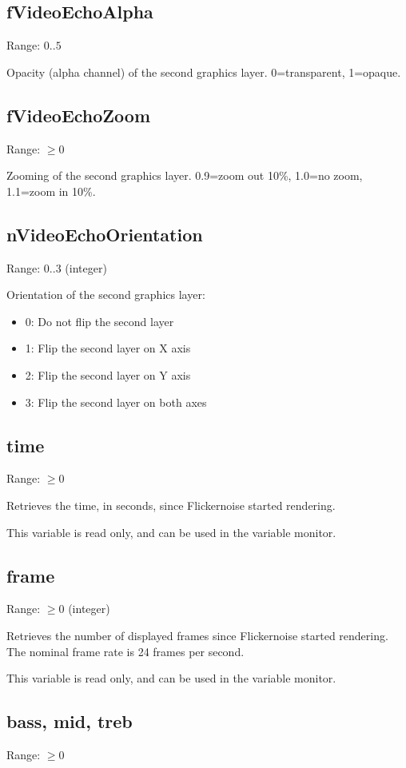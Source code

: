 \documentclass[11pt, a5paper, pagesize]{scrbook}
\begin{document}
\subsection{fVideoEchoAlpha}
Range: $0..5$

Opacity (alpha channel) of the second graphics layer. 0=transparent, 1=opaque.

\subsection{fVideoEchoZoom}
Range: $\geq 0$

Zooming of the second graphics layer. 0.9=zoom out 10\%, 1.0=no zoom, 1.1=zoom in 10\%.

\subsection{nVideoEchoOrientation}
Range: $0..3$ (integer)

Orientation of the second graphics layer:
\begin{itemize}
\item 0: Do not flip the second layer
\item 1: Flip the second layer on X axis
\item 2: Flip the second layer on Y axis
\item 3: Flip the second layer on both axes
\end{itemize}

\subsection{time}
Range: $\geq 0$

Retrieves the time, in seconds, since Flickernoise started rendering.

This variable is read only, and can be used in the variable monitor.

\subsection{frame}
Range: $\geq 0$ (integer)

Retrieves the number of displayed frames since Flickernoise started rendering. The nominal frame rate is 24 frames per second.

This variable is read only, and can be used in the variable monitor.

\subsection{bass, mid, treb}
Range: $\geq 0$
\end{document}
